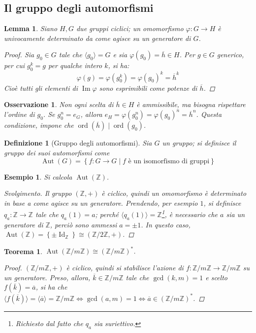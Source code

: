 \documentclass[12pt]{scrartcl}
\theoremstyle{style}
\newtheorem{esempio}{Esempio}[section]
\newtheorem{definizione}{Definizione}[section]
\newtheorem{teorema}{Teorema}[section]
\newtheorem{lemma}{Lemma}[teorema]
\newtheorem{osservazione}{Osservazione}[section]
\newenvironment{svolgimento}{\renewcommand\qedsymbol{$\blacksquare$}\begin{proof}[Svolgimento]}{\end{proof}}
\numberwithin{equation}{subsection}
\begin{document}
\subsection{Il gruppo degli automorfismi}
\begin{lemma}
	Siano $H,G$ due gruppi ciclici; un omomorfismo $\varphi : G \to H$ \`e univocamente determinato da come agisce su un generatore di $G$.
	\begin{proof}
		Sia $g_0\in G$ tale che $\langle g_0 \rangle = G$ e sia $\varphi (g_0) = \overline{h}\in H$.
		Per $g \in G$ generico, per cui $g_0^k = g$ per qualche intero $k$, si ha:
		\[
		\varphi (g) = \varphi (g_0^k) = \varphi (g_0)^k = \overline{h}^k
		\] 
		Cio\`e tutti gli elementi di $\operatorname{Im} \varphi $ sono esprimibili come potenze di $\overline{h}$.
	\end{proof}
\end{lemma}
\begin{osservazione}
Non ogni scelta di $\overline{h} \in H$ \`e ammissibile, ma bisogna rispettare l'ordine di $g_0$.
Se $g_0^n = e_G$, allora $e_H = \varphi (g_0^n) = \varphi (g_0)^n = \overline{h}^n$. Questa condizione, impone che $\operatorname{ord}(\overline{h})  \mid \operatorname{ord}(g_0) $.
\end{osservazione}
\begin{definizione}
	[Gruppo degli automorfismi]
	Sia $G$ un gruppo; si definisce il gruppo dei suoi automorfismi come
	\[
	\operatorname{Aut} (G) = \left\{ f: G \to G  \mid f \text{ \`e un isomorfismo di gruppi} \right\} 
	\] 
\end{definizione}
\begin{esempio}
	Si calcola $\operatorname{Aut} (\mathbb{Z})$. 
	\begin{svolgimento}
		Il gruppo $(\mathbb{Z},+)$ \`e ciclico, quindi un omomorfismo \`e determinato in base a come agisce su un generatore.
		Prendendo, per esempio $1$, si definisce $q_a :\mathbb{Z}\to \mathbb{Z} $ tale che $ q_a (1 ) = a$; perch\'e $\langle q_a(1) \rangle = \mathbb{Z}$\footnote{Richiesto dal fatto che $q_a$ sia suriettivo.}, \`e necessario che $a$ sia un generatore di $\mathbb{Z}$, perci\`o sono ammessi $a = \pm 1$. 
		In questo caso, $\operatorname{Aut} (\mathbb{Z})=\left\{ \pm \operatorname{Id} _{\mathbb{Z}}  \right\} \cong \left(\mathbb{Z} / 2\mathbb{Z}, +\right) $.
	\end{svolgimento}
\end{esempio}
\begin{teorema}
$\operatorname{Aut} (\mathbb{Z} / m \mathbb{Z}) \cong (\mathbb{Z} / m \mathbb{Z})^*$.
\begin{proof}
	$(\mathbb{Z} / m\mathbb{Z}, + )$ \`e ciclico, quindi si stabilisce l'azione di $f:\mathbb{Z} / m\mathbb{Z}\to \mathbb{Z}/ m\mathbb{Z}$ su un generatore.
	Preso, allora, $\overline{k} \in \mathbb{Z} / m\mathbb{Z} $ tale che $\operatorname{gcd}(k,m) =1$ e scelto $f(\overline{k}) = \overline{a}$, si ha che $\langle f(\overline{k}) \rangle= \langle \overline{a} \rangle= \mathbb{Z} / m\mathbb{Z} \iff \operatorname{gcd}(a,m) =1	\iff \overline{a} \in \left(\mathbb{Z} / m\mathbb{Z}\right) ^* $.
\end{proof}
\end{teorema}
\end{document}
